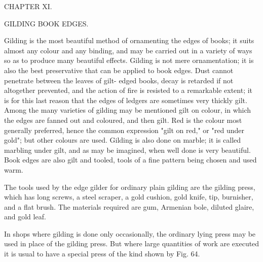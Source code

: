 \documentclass[twoside]{book}
\begin{document}
\pagebreak


\thispagestyle{empty}

\vspace*{\fill}

\begin{center}

\begin{large}CHAPTER XI.\end{large}

\begin{small}GILDING BOOK EDGES.\end{small}

\end{center}

\noindent
Gilding is the most beautiful method of ornamenting
the edges of books; it suits almost any colour
and any binding, and may be carried out in a
variety of ways so as to produce many beautiful
effects. Gilding is not mere ornamentation; it is
also the best preservative that can be applied to
book edges. Dust cannot penetrate between the
leaves of gilt- edged books, decay is retarded if not
altogether prevented, and the action of fire is
resisted to a remarkable extent; it is for this last
reason that the edges of ledgers are sometimes very
thickly gilt. Among the many varieties of gilding
may be mentioned gilt on colour, in which the edges
are fanned out and coloured, and then gilt. Red is
the colour most generally preferred, hence the
common expression "gilt on red," or "red under gold";
but other colours are used. Gilding is also done
on marble; it is called marbling under gilt, and as
may be imagined, when well done is very beautiful.
Book edges are also gilt and tooled, tools of a fine
pattern being chosen and used warm.

The tools used by the edge gilder for ordinary
plain gilding are the gilding press, which has long
screws, a steel scraper, a gold cushion, gold knife,
tip, burnisher, and a flat brush. The materials
required are gum, Armenian bole, diluted glaire, and
gold leaf.

In shops where gilding is done only occasionally,
the ordinary lying press may be used in place of
the gilding press. But where large quantities of
work are executed it is usual to have a special
press of the kind shown by Fig. 64.

\pagebreak
\end{document}
